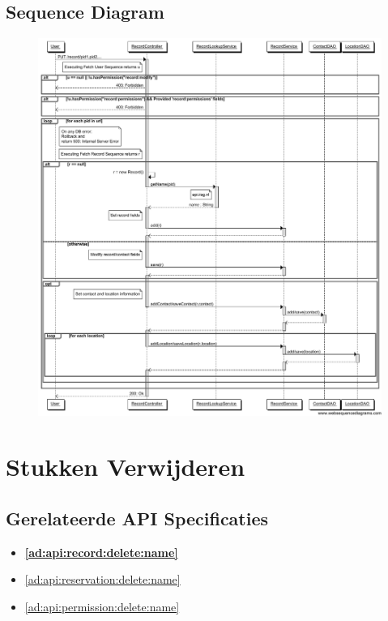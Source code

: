 \documentclass[a4paper,titlepage]{report}
\begin{document}
    \subsection{Sequence Diagram}
    \begin{figure}[H]
      \label{fig:put-record-sequence}
      \centering
      \includegraphics[width=\textwidth,trim=0 0.45cm 0
      0,clip]{put_record_sequence.pdf}
    \end{figure}
    \pagebreak

  \section{Stukken Verwijderen}
    \label{sec:delete-record-sequence}
    \subsection{Gerelateerde API Specificaties}
      \begin{itemize}
        \item \textbf{\ref{ad:api:record:delete:name}}
        \item \ref{ad:api:reservation:delete:name}
        \item \ref{ad:api:permission:delete:name}
      \end{itemize}
\end{document}
